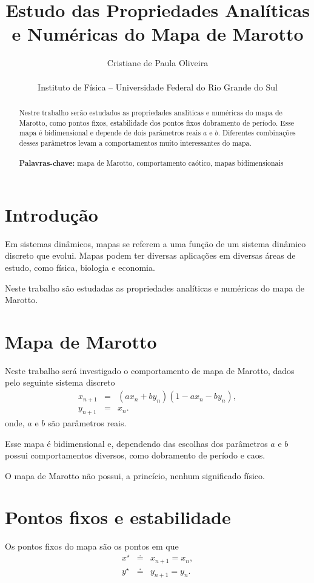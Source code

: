\documentclass[brazilian, 12pt, a4paper, final]{article}
\title{\textbf{Estudo das Propriedades Analíticas e Numéricas do Mapa de Marotto}}
\author{Cristiane de Paula Oliveira\\\\\small{Instituto de Física -- Universidade Federal do Rio Grande do Sul}}
\begin{document}
\maketitle

\begin{abstract}
  \noindent
  Nestre trabalho serão estudados as propriedades analíticas e numéricas do mapa de Marotto, como pontos fixos, estabilidade dos pontos fixos  dobramento de período. Esse mapa é bidimensional e depende de dois parâmetros reais $a$ e $b$. Diferentes combinações desses parâmetros levam a comportamentos muito interessantes do mapa. \\
  \\
  \textbf{Palavras-chave:} mapa de Marotto, comportamento caótico, mapas bidimensionais
\end{abstract}
\begin{multicols*}{2}
\section{Introdução}
Em sistemas dinâmicos, mapas se referem a uma função de um sistema dinâmico discreto que evolui. Mapas podem ter diversas aplicações em diversas áreas de estudo, como física, biologia e economia. 

Neste trabalho são estudadas as propriedades analíticas e numéricas do mapa de Marotto.

\section{Mapa de Marotto}
Neste trabalho será investigado o comportamento de mapa de Marotto, dados pelo seguinte sistema discreto
\begin{eqnarray}
  x_{n+1}&=&(ax_n+by_n)(1-ax_n-by_n), \label{eq:mapax} \\
  y_{n+1}&=&x_n. \label{eq:mapay}
\end{eqnarray}
onde, $a$ e $b$ são parâmetros reais.

Esse mapa é bidimensional e, dependendo das escolhas dos parâmetros $a$ e $b$ possui comportamentos diversos, como dobramento de período e caos.

O mapa de Marotto não possui, a princício, nenhum significado físico.

\section{Pontos fixos e estabilidade}
Os pontos fixos do mapa são os pontos em que
\begin{eqnarray}
  x^{\star} &\doteq & x_{n+1}=x_{n},\\
  y^{\star} &\doteq & y_{n+1}=y_{n}.
\end{eqnarray}


\end{multicols*}
\end{document}
